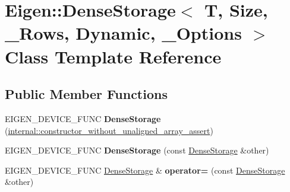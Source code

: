 \hypertarget{class_eigen_1_1_dense_storage_3_01_t_00_01_size_00_01___rows_00_01_dynamic_00_01___options_01_4}{}\section{Eigen\+::Dense\+Storage$<$ T, Size, \+\_\+\+Rows, Dynamic, \+\_\+\+Options $>$ Class Template Reference}
\label{class_eigen_1_1_dense_storage_3_01_t_00_01_size_00_01___rows_00_01_dynamic_00_01___options_01_4}
\subsection*{Public Member Functions}
\begin{DoxyCompactItemize}
\item 
\mbox{\label{class_eigen_1_1_dense_storage_3_01_t_00_01_size_00_01___rows_00_01_dynamic_00_01___options_01_4_a33e2d80dc95f56436fa4203b92730b11}} 
E\+I\+G\+E\+N\+\_\+\+D\+E\+V\+I\+C\+E\+\_\+\+F\+U\+NC {\bfseries Dense\+Storage} (\mbox{\hyperlink{struct_eigen_1_1internal_1_1constructor__without__unaligned__array__assert}{internal\+::constructor\+\_\+without\+\_\+unaligned\+\_\+array\+\_\+assert}})
\item 
\mbox{\label{class_eigen_1_1_dense_storage_3_01_t_00_01_size_00_01___rows_00_01_dynamic_00_01___options_01_4_ab25c8b96ebc898d4a69bc99252d196f2}} 
E\+I\+G\+E\+N\+\_\+\+D\+E\+V\+I\+C\+E\+\_\+\+F\+U\+NC {\bfseries Dense\+Storage} (const \mbox{\hyperlink{class_eigen_1_1_dense_storage}{Dense\+Storage}} \&other)
\item 
\mbox{\label{class_eigen_1_1_dense_storage_3_01_t_00_01_size_00_01___rows_00_01_dynamic_00_01___options_01_4_aee2aff42b844dd472bd62fb5212df486}} 
E\+I\+G\+E\+N\+\_\+\+D\+E\+V\+I\+C\+E\+\_\+\+F\+U\+NC \mbox{\hyperlink{class_eigen_1_1_dense_storage}{Dense\+Storage}} \& {\bfseries operator=} (const \mbox{\hyperlink{class_eigen_1_1_dense_storage}{Dense\+Storage}} \&other)
\item 
\mbox{\label{class_eigen_1_1_dense_storage_3_01_t_00_01_size_00_01___rows_00_01_dynamic_00_01___options_01_4_a474eb4d3e1ee2002806f881e145fdaae}} 

\end{DoxyCompactItemize}

